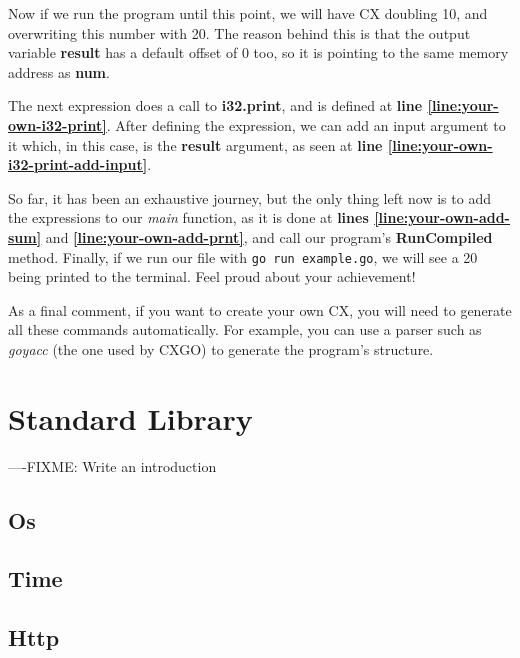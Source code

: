 \documentclass[11pt,fleqn,openany]{book} %
\begin{document}
Now if we run the program until this point, we will have CX doubling 10, and overwriting this number with 20. The reason behind this is that the output variable \textbf{result} has a default offset of 0 too, so it is pointing to the same memory address as \textbf{num}.

The next expression does a call to \textbf{i32.print}, and is defined at \textbf{line \ref{line:your-own-i32-print}}. After defining the expression, we can add an input argument to it which, in this case, is the \textbf{result} argument, as seen at \textbf{line \ref{line:your-own-i32-print-add-input}}.

So far, it has been an exhaustive journey, but the only thing left now is to add the expressions to our \emph{main} function, as it is done at \textbf{lines \ref{line:your-own-add-sum}} and \textbf{\ref{line:your-own-add-prnt}}, and call our program's \textbf{RunCompiled} method. Finally, if we run our file with \lstinline{go run example.go}, we will see a 20 being printed to the terminal. Feel proud about your achievement!

As a final comment, if you want to create your own CX, you will need to generate all these commands automatically. For example, you can use a parser such as \emph{goyacc} (the one used by CXGO) to generate the program's structure. 


\chapter{Standard Library}

----FIXME: Write an introduction

\section{Os}
\label{section:library-os}

\section{Time}
\label{section:library-time}

\section{Http}
\label{section:library-http}
\end{document}
